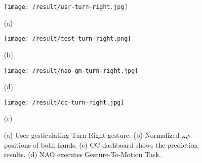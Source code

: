 \begin{figure}
	[h] 
	\begin{minipage}
		{0.3 
		\textwidth} 
		\texttt{[image: /result/usr-turn-right.jpg]} \caption*{(a)} 
	\end{minipage}
	\begin{minipage}
		{0.7
			\textwidth} 
		\texttt{[image: /result/test-turn-right.png]} \caption*{(b)} 
	\end{minipage}
	\begin{minipage}
		{0.3
		\textwidth}
		\texttt{[image: /result/nao-gm-turn-right.jpg]} \caption*{(d)} 
	\end{minipage}
	\begin{minipage}
		{0.7
			\textwidth}
		\texttt{[image: /result/cc-turn-right.jpg]}	\caption*{(c)} 
	\end{minipage}
	\caption{(a) User gesticulating Turn Right gesture. (b) Normalized x,y positions of both hands. (c) CC dashboard shows the prediction results. (d) NAO executes Gesture-To-Motion Task.} \label{res:gm:turn-right} 
\end{figure}